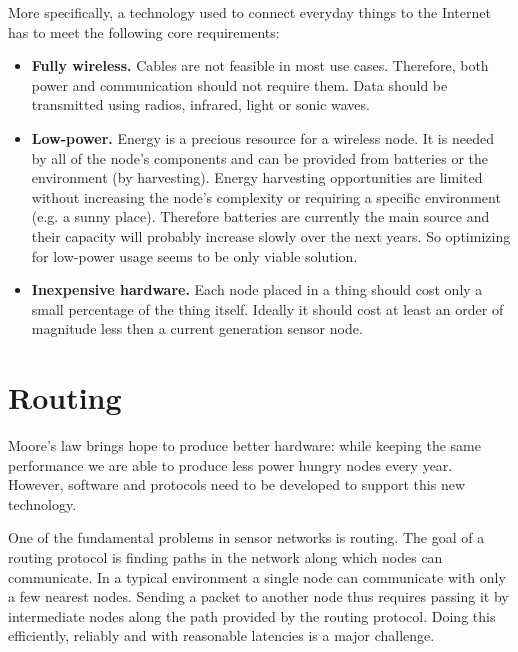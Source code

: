 More specifically, a technology used to connect everyday things to the Internet has to meet the following core requirements:
\begin{itemize}
  \item \textbf{Fully wireless.} Cables are not feasible in most use cases. Therefore, both power and communication should not require them.
Data should be transmitted using radios, infrared, light or sonic waves.
  \item \textbf{Low-power.} Energy is a precious resource for a wireless node.
It is needed by all of the node's components and can be provided from batteries or the environment (by harvesting).
Energy harvesting opportunities are limited without increasing the node's complexity or requiring a specific environment (e.g. a sunny place).
Therefore batteries are currently the main source and their capacity will probably increase slowly over the next years. So optimizing for low-power usage seems to be only viable solution.
  \item \textbf{Inexpensive hardware.} Each node placed in a thing should cost only a small percentage of the thing itself.
Ideally it should cost at least an order of magnitude less then a current generation sensor node.
\end{itemize}

\section{Routing}
Moore's law brings hope to produce better hardware: while keeping the same performance we are able to produce less power hungry nodes every year.
However, software and protocols need to be developed to support this new technology.

One of the fundamental problems in sensor networks is routing.
The goal of a routing protocol is finding paths in the network along which nodes can communicate.
In a typical environment a single node can communicate with only a few nearest nodes.
Sending a packet to another node thus requires passing it by intermediate nodes along the path provided by the routing protocol.
Doing this efficiently, reliably and with reasonable latencies is a major challenge.

